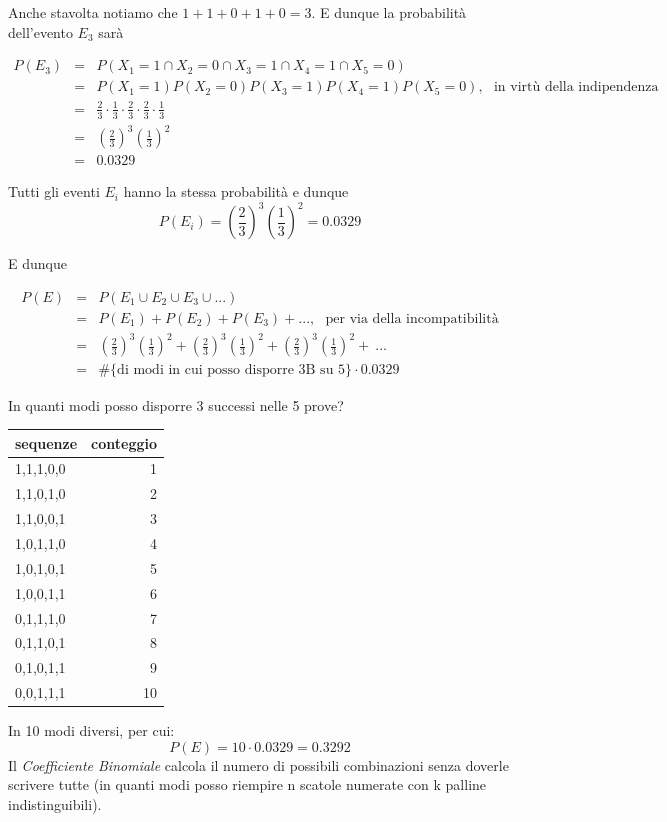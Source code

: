 \documentclass[
  11pt,
]{book}
\theoremstyle{mytheoremstyle}
\theoremstyle{mydefstyle}
\begin{document}
Anche stavolta notiamo che \(1+1+0+1+0=3\). E dunque la probabilità dell'evento \(E_3\) sarà

\begin{eqnarray*}
P(E_3)&=&P(X_1=1\cap  X_2=0\cap  X_3=1\cap  X_4 =1\cap  X_5=0)\\
      &=&P(X_1=1)P(X_2=0)P(X_3=1)P(X_4=1)P(X_5=0),~~~\text{in virtù della indipendenza}\\
      &=&\frac2 3\cdot\frac1 3\cdot\frac2 3\cdot \frac 2 3 \cdot \frac 1 3\\
      &=&\left(\frac 2 3\right)^3\left(\frac 1 3\right)^2\\
      &=& 0.0329
\end{eqnarray*}

Tutti gli eventi \(E_i\) hanno la stessa probabilità e dunque
\[
P(E_i)=\left(\frac 2 3\right)^3\left(\frac 1 3\right)^2 = 0.0329
\]

E dunque

\begin{eqnarray*}
P(E)&=&P(E_1\cup E_2\cup E_3\cup...)\\
      &=&P(E_1)+P(E_2)+P(E_3)+...,~~~\text{per via della incompatibilità}\\
      &=&\left(\frac 2 3\right)^3\left(\frac 1 3\right)^2+\left(\frac 2 3\right)^3\left(\frac 1 3\right)^2+\left(\frac 2 3\right)^3\left(\frac 1 3\right)^2+~...\\
      &=& \#\{\text{di modi in cui posso disporre 3B su 5}\}\cdot0.0329
\end{eqnarray*}

In quanti modi posso disporre 3 successi nelle 5 prove?

\begin{tabular}{lr}
\toprule
sequenze & conteggio\\
\midrule
1,1,1,0,0 & 1\\
1,1,0,1,0 & 2\\
1,1,0,0,1 & 3\\
1,0,1,1,0 & 4\\
1,0,1,0,1 & 5\\
1,0,0,1,1 & 6\\
0,1,1,1,0 & 7\\
0,1,1,0,1 & 8\\
0,1,0,1,1 & 9\\
0,0,1,1,1 & 10\\
\bottomrule
\end{tabular}

In 10 modi diversi, per cui:
\[
P(E)=10\cdot0.0329=0.3292
\]
Il \emph{Coefficiente Binomiale} calcola il numero di possibili combinazioni senza doverle scrivere tutte (in quanti modi posso riempire n scatole numerate con k palline indistinguibili).
\end{document}
